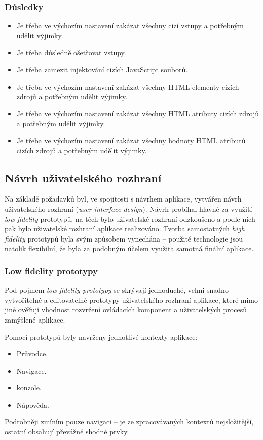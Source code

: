\subsubsection{Důsledky}
\begin{itemize}
 \item Je třeba ve výchozím nastavení zakázat všechny cizí vstupy a potřebným udělit výjimky.
 \item Je třeba důsledně ošetřovat vstupy.
 \item Je třeba zamezit injektování cizích JavaScript souborů.
 \item Je třeba ve výchozím nastavení zakázat všechny HTML elementy cizích zdrojů a potřebným udělit výjimky.
 \item Je třeba ve výchozím nastavení zakázat všechny HTML atributy cizích zdrojů a potřebným udělit výjimky.
 \item Je třeba ve výchozím nastavení zakázat všechny hodnoty HTML atributů cizích zdrojů a potřebným udělit výjimky.
\end{itemize}


\subsection{Návrh uživatelského rozhraní}
Na základě požadavků byl, ve spojitosti s návrhem aplikace, vytvářen návrh uživatelského rozhraní (\textit{user interface design}). Návrh probíhal hlavně za využití \textit{low fidelity} prototypů, na těch bylo uživatelské rozhraní odzkoušeno a podle nich pak bylo uživatelské rozhraní aplikace realizováno. Tvorba samostatných \textit{high fidelity} prototypů byla svým způsobem vynechána -- použité technologie jsou natolik flexibilní, že byla za podobným účelem využita samotná finální aplikace.

\subsubsection{Low fidelity prototypy}
Pod pojmem \textit{low fidelity prototypy} se skrývají jednoduché, velmi snadno vytvořitelné a editovatelné prototypy uživatelského rozhraní aplikace, které mimo jiné ověřují vhodnost rozvržení ovládacích komponent a uživatelských procesů zamýšlené aplikace.

Pomocí prototypů byly navrženy jednotlivé kontexty aplikace:
\begin{itemize}
 \item Průvodce.
 \item Navigace.
 \item {} konzole.
 \item Nápověda.
\end{itemize}
Podrobněji zmíním pouze navigaci -- je ze zpracovávaných kontextů nejsložitější, ostatní obsahují převážně shodné prvky.

